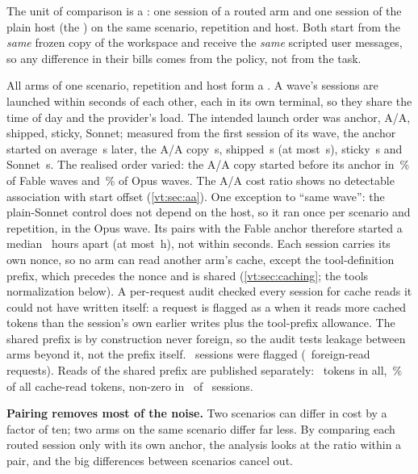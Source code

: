 The unit of comparison is a : one session of a routed arm and one session of the plain host
(the ) on the same scenario, repetition and host. Both start from the \emph{same} frozen copy
of the workspace and receive the \emph{same} scripted user messages, so any difference in their bills
comes from the policy, not from the task.

All arms of one scenario, repetition and host form a . A wave's sessions are launched within
seconds of each other, each in its own terminal, so they share the time of day and the provider's load.
The intended launch order was anchor, A/A, shipped, sticky, Sonnet; measured from the first session of its wave,
the anchor started on average \StaggerAnchor\,s later, the A/A copy \StaggerAA\,s, shipped \StaggerShipped\,s (at
most \StaggerShippedMax\,s), sticky \StaggerSticky\,s and Sonnet \StaggerSonnet\,s. The realised order varied:
the A/A copy started before its anchor in \RvAAFirstFable\,\% of Fable waves and \RvAAFirstOpus\,\% of Opus waves.
The A/A cost ratio shows no detectable association with start offset (\cref{vt:sec:aa}). One exception to ``same wave'': the plain-Sonnet
control does not depend on the host, so it ran once per scenario and repetition, in the Opus wave. Its pairs with
the Fable anchor therefore started a median \RvSonnetWaveMedianH\ hours apart (at most \RvSonnetWaveMaxH\,h), not
within seconds. Each session carries its own
nonce, so no arm can read another arm's cache, except the tool-definition prefix, which precedes the nonce and is
shared (\cref{vt:sec:caching}; the tools normalization below). A per-request audit checked every
session for cache reads it could not have written itself: a request is flagged as a  when it reads
more cached tokens than the session's own earlier writes plus the tool-prefix allowance. The shared prefix is by
construction never foreign, so the audit tests leakage between arms beyond it, not the prefix itself.
\AuditFlagged\ sessions were flagged (\RgForeignRequests\ foreign-read requests). Reads of the shared prefix are
published separately: \RgCrossTokens\ tokens in all, \RgCrossShare\,\% of all cache-read tokens, non-zero in
\RgCrossSessions\ of \NSessions\ sessions.

\begin{keyidea}
\textbf{Pairing removes most of the noise.} Two scenarios can differ in cost by a factor of ten; two arms on
the same scenario differ far less. By comparing each routed session only with its own anchor, the
analysis looks at the ratio within a pair, and the big differences between scenarios cancel out.
\end{keyidea}

